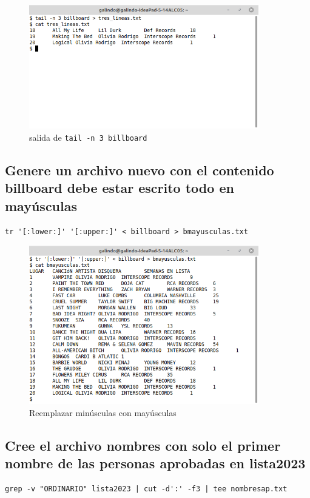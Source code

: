 \documentclass[11pt]{article}
\begin{document}
\begin{figure}[htbp]
\centering
\includegraphics[width=10cm]{img/6.png}
\caption[\texttt{tail -n 3 billboard}]{salida de \texttt{tail -n 3 billboard}}
\end{figure}

\pagebreak

\subsection{Genere un archivo nuevo con el contenido billboard debe estar escrito todo en mayúsculas}
\label{sec:org2db5c79}
\begin{verbatim}
tr '[:lower:]' '[:upper:]' < billboard > bmayusculas.txt
\end{verbatim}

\begin{figure}[htbp]
\centering
\includegraphics[width=10cm]{img/7.png}
\caption{Reemplazar minúsculas con mayúsculas}
\end{figure}

\subsection{Cree el archivo nombres con solo el primer nombre de las personas aprobadas en lista2023}
\label{sec:orgddb45af}
\begin{verbatim}
grep -v "ORDINARIO" lista2023 | cut -d':' -f3 | tee nombresap.txt
\end{verbatim}
\end{document}

